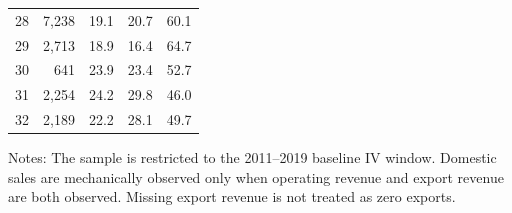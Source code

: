 \begin{table}[!htbp]
\begin{tabular}{lrrrr}
28 & 7,238 & 19.1 & 20.7 & 60.1 \\
29 & 2,713 & 18.9 & 16.4 & 64.7 \\
30 & 641 & 23.9 & 23.4 & 52.7 \\
31 & 2,254 & 24.2 & 29.8 & 46.0 \\
32 & 2,189 & 22.2 & 28.1 & 49.7 \\
\bottomrule
\end{tabular}
\begin{minipage}{0.92\textwidth}
\vspace{0.3em}\footnotesize Notes: The sample is restricted to the 2011--2019 baseline IV window. Domestic sales are mechanically observed only when operating revenue and export revenue are both observed. Missing export revenue is not treated as zero exports.
\end{minipage}
\end{table}
